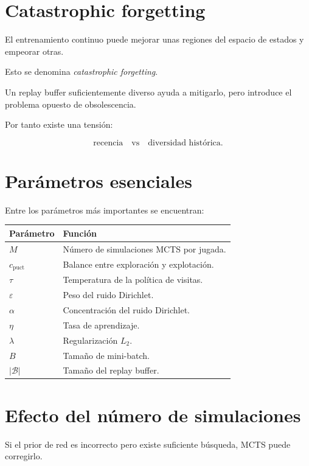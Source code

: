 \documentclass[11pt,a4paper]{article}
\begin{document}
\section{Catastrophic forgetting}

El entrenamiento continuo puede mejorar unas regiones del espacio de estados y empeorar otras.

Esto se denomina \emph{catastrophic forgetting}.

Un replay buffer suficientemente diverso ayuda a mitigarlo, pero introduce el problema opuesto de obsolescencia.

Por tanto existe una tensión:

\[
\text{recencia}
\quad\text{vs}\quad
\text{diversidad histórica}.
\]

\section{Parámetros esenciales}

Entre los parámetros más importantes se encuentran:

\begin{longtable}{>{\raggedright\arraybackslash}p{}
                  >{\raggedright\arraybackslash}p{}}
\toprule
\textbf{Parámetro} & \textbf{Función} \\
\midrule
\(M\) & Número de simulaciones MCTS por jugada.\\
\(c_{\mathrm{puct}}\) & Balance entre exploración y explotación.\\
\(\tau\) & Temperatura de la política de visitas.\\
\(\varepsilon\) & Peso del ruido Dirichlet.\\
\(\alpha\) & Concentración del ruido Dirichlet.\\
\(\eta\) & Tasa de aprendizaje.\\
\(\lambda\) & Regularización \(L_2\).\\
\(B\) & Tamaño de mini-batch.\\
\(|\mathcal{B}|\) & Tamaño del replay buffer.\\
\bottomrule
\end{longtable}

\section{Efecto del número de simulaciones}

Si el prior de red es incorrecto pero existe suficiente búsqueda, MCTS puede corregirlo.
\end{document}
